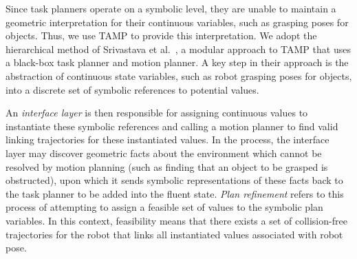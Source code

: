 

Since task planners operate on a symbolic level,
they are unable to maintain a geometric interpretation for their continuous variables, such
as grasping poses for objects. Thus, we use TAMP to provide this interpretation. We adopt the hierarchical method of
Srivastava et al.~\cite{srivastava2014combined}, a modular approach to TAMP
that uses a black-box task planner and motion planner. A key step in their approach is the
abstraction of continuous state variables, such as robot grasping poses for objects, into a
discrete set of symbolic references to potential values.

An \emph{interface layer} is then responsible
for assigning continuous values to instantiate these symbolic references and calling a motion planner to find valid
linking trajectories for these instantiated values. In the process, the interface layer may discover
geometric facts about the environment which cannot be resolved by motion planning (such as finding that an object
to be grasped is obstructed), upon which it sends symbolic representations of these facts back to
the task planner to be added into the fluent state. \emph{Plan refinement} refers to this process
of attempting to assign a feasible set of values to the symbolic plan variables. In this context, feasibility
means that there exists a set of collision-free trajectories for the robot that links all instantiated
values associated with robot pose.

